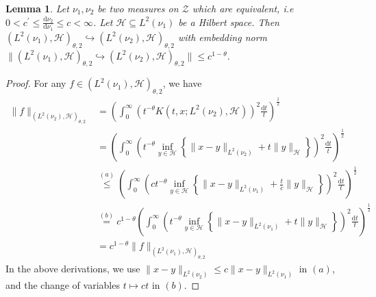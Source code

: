 \documentclass[11pt]{article}
\newcommand{\calZ}{\mathcal{Z}}
\newcommand{\calH}{\mathcal{H}}
\newcommand{\0}{\mathbf{0}}
\newtheorem{lem}{Lemma}[section]
\begin{document}
\begin{appendix}
\begin{lem}
\label{lem:interpolation_equiv_measure}
    Let $\nu_1,\nu_2$ be two measures on $\calZ$ which are equivalent, i.e $0 < c^\prime \leq \frac{\mathrm{d}\nu_2}{\mathrm{d}\nu_1} \leq c < \infty$.
    Let $\mathcal{H}\subseteq L^2(\nu_1)$ be a Hilbert space. Then $(L^2(\nu_1),\calH)_{\theta,2} \hookrightarrow (L^2(\nu_2), \calH)_{\theta,2}$ with embedding norm $\| (L^2(\nu_1),\calH)_{\theta,2} \hookrightarrow (L^2(\nu_2), \calH)_{\theta,2} \| \leq c^{1-\theta}$. 
\end{lem}
\begin{proof}
For any $f \in (L^2(\nu_1),\calH)_{\theta,2}$, we have
\begin{align*}
   \|f\|_{\left(L^2(\nu_2), \calH\right)_{\theta,2}}&= \left(\int_{0}^{\infty}\left(t^{-\theta}K(t,x;L^2(\nu_2),\calH)\right)^{2}\frac{\mathrm{d}t}{t}\right)^{\frac{1}{2}}\\  &= \left(\int_{0}^{\infty}\left(t^{-\theta}\inf_{y\in \calH}\left\{\|x-y\|_{L^2(\nu_2)} + t\|y\|_{\calH}\right\}\right)^{2}\frac{\mathrm{d}t}{t}\right)^{\frac{1}{2}} 
    \\
    &\stackrel{(a)}{\leq} \left(\int_{0}^{\infty}\left(ct^{-\theta}\inf_{y\in \calH}\left\{\|x-y\|_{L^2(\nu_1)} + \frac{t}{c}\|y\|_{\calH}\right\}\right)^{2}\frac{\mathrm{d}t}{t}\right)^{\frac{1}{2}}\\
    &\stackrel{(b)}{=} c^{1-\theta}\left(\int_{0}^{\infty}\left(t^{-\theta}\inf_{y\in \calH}\left\{\|x-y\|_{L^2(\nu_1)} + t\|y\|_{\calH}\right\}\right)^{2}\frac{\mathrm{d}t}{t}\right)^{\frac{1}{2}}\\
    &= c^{1-\theta}\|f\|_{\left(L^2(\nu_1), \calH\right)_{\theta,2}}
\end{align*}
In the above derivations, we use $\|x-y\|_{L^2(\nu_2)}\leq c\|x-y\|_{L^2(\nu_1)}$ in $(a)$, and the change of variables $t\mapsto ct$ in $(b)$. 
\end{proof}


\end{appendix}
\end{document}
